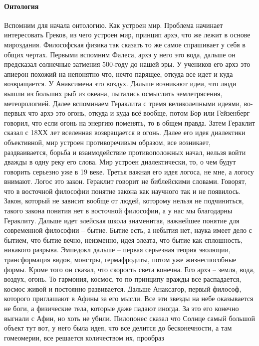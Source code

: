 \documentclass[a4paper, 12pt]{article}
\begin{document}
\paragraph{Онтология}
Вспомним для начала онтологию. Как устроен мир. Проблема начинает 
интересовать Греков, из чего устроен мир, принцип архэ, что же лежит 
в основе мироздания. Философская физика так сказать то же самое 
спрашивает у себя в общих чертах. Первыми вспомним Фалеса, архэ у него 
это вода, дальше он предсказал солнечные затмения 500-году до нашей эры. 
У учеников его архэ это апиерон похожий на непонятно что, нечто парящее, 
откуда все идет и куда возвращается. У Анаксимена это воздух. Дальше 
возникают идеи, что люди вышли из больших рыб из океана, пытались 
осмыслить землетрясения, метеорологией. Далее вспоминаем Гераклита 
с тремя великолепными идеями, во-первых что архэ это огонь, откуда 
и куда всё вообще, потом Бор или Гейзенберг говорил, что если огонь на 
энергию поменять, то в общем правда. Затем Гераклит сказал с 18ХХ лет 
вселенная возвращается в огонь. Далее его идея диалектики объективной, 
мир устроен противоречивым образом, все возникает, раздваивается, борьба 
и взаимодействие противоположных начал, нельзя войти дважды в одну реку 
его слова. Мир устроен диалектически, то, о чем будут говорить серьезно 
уже в 19 веке. Третья важная его идея логоса, не мне, а логосу внимают. 
Логос это закон. Гераклит говорит не библейскими словами. Говорят, что 
в восточной философии понятие закона как научного так и не появилось. 
Закон, который не зависит вообще от людей, которому нельзя не 
подчиниться, такого закона понятия нет в восточной философии, а у нас мы 
благодарны Гераклиту. Дальше идет элейская школа знаменитая, важнейшее 
понятие для современной философии -- бытие. Бытие есть, а небытия нет, 
наука имеет дело с бытием, что бытие вечно, неизменно, идея элеата, что 
бытие как сплошность, никакого разрыва. Эмпедокл дальше -- первая 
серьезная теория эволюции, трансформация видов, монстры, гермафродиты, 
потом уже жизнеспособные формы. Кроме того он сказал, что скорость света 
конечна. Его архэ -- земля, вода, воздух, огонь. То гармония, космос, то 
по принципу вражды все распадается, космос живой и постоянно 
развивается. Дальше Анаксагор, первый философ, которого приглашают 
в Афины за его мысли. Все эти звезды на небе оказывается не боги, 
а физические тела, которые даже падают иногда. За это его конечно 
выгнали с Афин, но хоть не убили. Пилопонес сказал что Солнце самый 
большой объект тут вот, у него была идея, что все делится до 
бесконечности, а там гомеомерии, все решается количеством их, прообраз 
\end{document}
